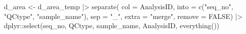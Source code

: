 \documentclass[
  letterpaper,
  DIV=11,
  numbers=noendperiod]{scrreprt}
\newenvironment{Shaded}{\begin{snugshade}}{\end{snugshade}}
\newcommand{\AttributeTok}[1]{\textcolor[rgb]{0.40,0.45,0.13}{#1}}
\newcommand{\ConstantTok}[1]{\textcolor[rgb]{0.56,0.35,0.01}{#1}}
\newcommand{\FunctionTok}[1]{\textcolor[rgb]{0.28,0.35,0.67}{#1}}
\newcommand{\NormalTok}[1]{\textcolor[rgb]{0.00,0.23,0.31}{#1}}
\newcommand{\OtherTok}[1]{\textcolor[rgb]{0.00,0.23,0.31}{#1}}
\newcommand{\SpecialCharTok}[1]{\textcolor[rgb]{0.37,0.37,0.37}{#1}}
\newcommand{\StringTok}[1]{\textcolor[rgb]{0.13,0.47,0.30}{#1}}
\begin{document}
\begin{Shaded}
\begin{Highlighting}[]
\NormalTok{d\_area }\OtherTok{\textless{}{-}}\NormalTok{ d\_area\_temp }\SpecialCharTok{|\textgreater{}} 
  \FunctionTok{separate}\NormalTok{(}
    \AttributeTok{col =}\NormalTok{ AnalysisID,}
    \AttributeTok{into =} \FunctionTok{c}\NormalTok{(}\StringTok{"seq\_no"}\NormalTok{, }\StringTok{"QCtype"}\NormalTok{, }\StringTok{"sample\_name"}\NormalTok{), }
    \AttributeTok{sep =} \StringTok{"\_"}\NormalTok{,}
    \AttributeTok{extra =} \StringTok{"merge"}\NormalTok{, }
    \AttributeTok{remove =} \ConstantTok{FALSE}\NormalTok{) }\SpecialCharTok{|\textgreater{}} 
\NormalTok{  dplyr}\SpecialCharTok{::}\FunctionTok{select}\NormalTok{(seq\_no, QCtype, sample\_name, AnalysisID, }\FunctionTok{everything}\NormalTok{())}
    

\end{Highlighting}
\end{Shaded}
\end{document}
